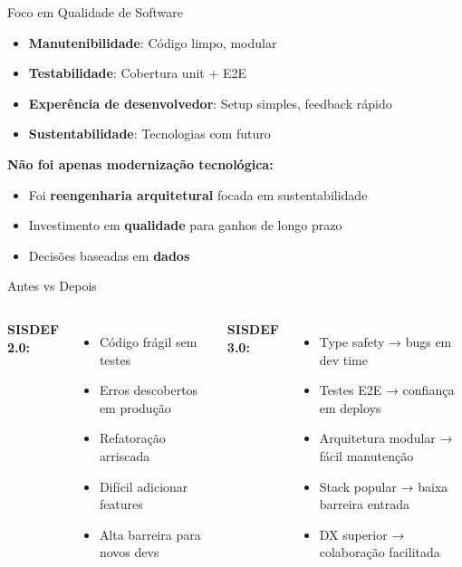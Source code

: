 \documentclass[aspectratio=169,xcolor=table]{beamer}
\begin{document}
\begin{frame}{Foco em Qualidade de Software}
    \begin{itemize}
        \item \textbf{Manutenibilidade}: Código limpo, modular
        \item \textbf{Testabilidade}: Cobertura unit + E2E
        \item \textbf{Experência de desenvolvedor}: Setup simples, feedback rápido
        \item \textbf{Sustentabilidade}: Tecnologias com futuro
    \end{itemize}
    
    \vspace{1em}
    \textbf{Não foi apenas modernização tecnológica:}
    \begin{itemize}
        \item Foi \textbf{reengenharia arquitetural} focada em sustentabilidade
        \item Investimento em \textbf{qualidade} para ganhos de longo prazo
        \item Decisões baseadas em \textbf{dados}
    \end{itemize}
\end{frame}
\begin{frame}{Antes vs Depois}
    \hspace{0.5em}
    \begin{columns}[T]
        \textbf{SISDEF 2.0:}
        \begin{itemize}
            \item  Código frágil sem testes
            \item  Erros descobertos em produção
            \item  Refatoração arriscada
            \item  Difícil adicionar features
            \item  Alta barreira para novos devs
        \end{itemize}
        
        \textbf{SISDEF 3.0:}
        \begin{itemize}
            \item  Type safety → bugs em dev time
            \item  Testes E2E → confiança em deploys
            \item  Arquitetura modular → fácil manutenção
            \item  Stack popular → baixa barreira entrada
            \item  DX superior → colaboração facilitada
        \end{itemize}
    \end{columns}
\end{frame}
\end{document}
